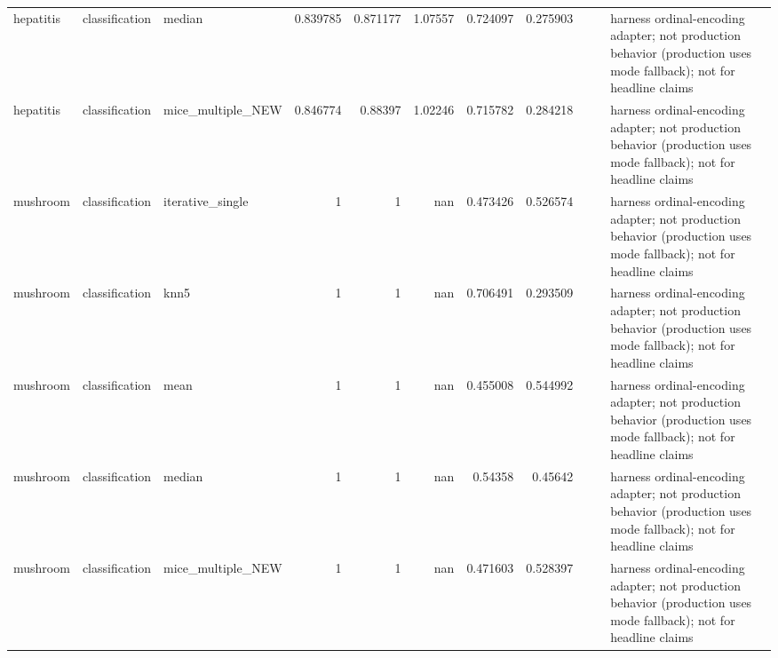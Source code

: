 \begin{table}[ht]
{\begin{tabular}{lllrrrrrlll}
 hepatitis      & classification & median            &   0.839785 &   0.871177 &               1.07557  &                       0.724097 &                         0.275903 &                                                                       &                    & harness ordinal-encoding adapter; not production behavior (production uses mode fallback); not for headline claims \\
 hepatitis      & classification & mice\_multiple\_NEW &   0.846774 &   0.88397  &               1.02246  &                       0.715782 &                         0.284218 &                                                                       &                    & harness ordinal-encoding adapter; not production behavior (production uses mode fallback); not for headline claims \\
 mushroom       & classification & iterative\_single  &   1        &   1        &             nan        &                       0.473426 &                         0.526574 &                                                                       &                    & harness ordinal-encoding adapter; not production behavior (production uses mode fallback); not for headline claims \\
 mushroom       & classification & knn5              &   1        &   1        &             nan        &                       0.706491 &                         0.293509 &                                                                       &                    & harness ordinal-encoding adapter; not production behavior (production uses mode fallback); not for headline claims \\
 mushroom       & classification & mean              &   1        &   1        &             nan        &                       0.455008 &                         0.544992 &                                                                       &                    & harness ordinal-encoding adapter; not production behavior (production uses mode fallback); not for headline claims \\
 mushroom       & classification & median            &   1        &   1        &             nan        &                       0.54358  &                         0.45642  &                                                                       &                    & harness ordinal-encoding adapter; not production behavior (production uses mode fallback); not for headline claims \\
 mushroom       & classification & mice\_multiple\_NEW &   1        &   1        &             nan        &                       0.471603 &                         0.528397 &                                                                       &                    & harness ordinal-encoding adapter; not production behavior (production uses mode fallback); not for headline claims \\

\end{tabular}}
\end{table}
